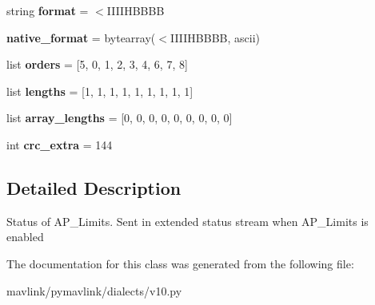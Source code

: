 \begin{DoxyCompactItemize}
\item 
\mbox{\label{classpymavlink_1_1dialects_1_1v10_1_1MAVLink__limits__status__message_abe4a15c9887a9d876bf355a7970c0e85}} 
string {\bfseries format} = \textquotesingle{}$<$I\+I\+I\+I\+H\+B\+B\+BB\textquotesingle{}
\item 
\mbox{\label{classpymavlink_1_1dialects_1_1v10_1_1MAVLink__limits__status__message_a543f2974bbab4a1e0bc738f4bed467e2}} 
{\bfseries native\+\_\+format} = bytearray(\textquotesingle{}$<$I\+I\+I\+I\+H\+B\+B\+BB\textquotesingle{}, \textquotesingle{}ascii\textquotesingle{})
\item 
\mbox{\label{classpymavlink_1_1dialects_1_1v10_1_1MAVLink__limits__status__message_a9de389d34940e60569ee948051b3121e}} 
list {\bfseries orders} = \mbox{[}5, 0, 1, 2, 3, 4, 6, 7, 8\mbox{]}
\item 
\mbox{\label{classpymavlink_1_1dialects_1_1v10_1_1MAVLink__limits__status__message_aeece51564afc315cb6723c510f11b618}} 
list {\bfseries lengths} = \mbox{[}1, 1, 1, 1, 1, 1, 1, 1, 1\mbox{]}
\item 
\mbox{\label{classpymavlink_1_1dialects_1_1v10_1_1MAVLink__limits__status__message_af667b05cb68832edb50516384c4900d3}} 
list {\bfseries array\+\_\+lengths} = \mbox{[}0, 0, 0, 0, 0, 0, 0, 0, 0\mbox{]}
\item 
\mbox{\label{classpymavlink_1_1dialects_1_1v10_1_1MAVLink__limits__status__message_a4f766961365ab192a4b03fa8f55bb0bd}} 
int {\bfseries crc\+\_\+extra} = 144
\end{DoxyCompactItemize}


\subsection{Detailed Description}
\begin{DoxyVerb}Status of AP_Limits. Sent in extended status stream when
AP_Limits is enabled
\end{DoxyVerb}
 

The documentation for this class was generated from the following file\+:\begin{DoxyCompactItemize}
\item 
mavlink/pymavlink/dialects/v10.\+py\end{DoxyCompactItemize}
